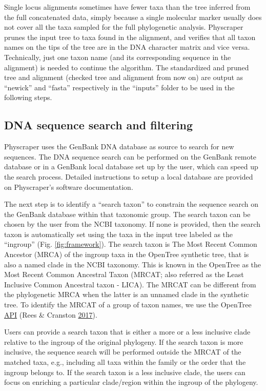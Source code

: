 \documentclass[]{article}
\begin{document}
Single locus alignments sometimes have fewer taxa than the tree inferred from the full concatenated data, simply because a single molecular marker usually does not cover all the taxa sampled for the full phylogenetic analysis. Physcraper prunes the input tree to taxa found in the alignment, and verifies that all taxon names on the tips of the tree are in the DNA character matrix and vice versa. Technically, just one taxon name (and its corresponding sequence in the alignment) is needed to continue the algorithm.
The standardized and pruned tree and alignment (checked tree and alignment from now on) are output as ``newick'' and ``fasta'' respectively in the ``inputs'' folder to be used in the following steps.

\hypertarget{dna-sequence-search-and-filtering}{%
\subsection{DNA sequence search and filtering}\label{dna-sequence-search-and-filtering}}

Physcraper uses the GenBank DNA database as source to search for new sequences. The DNA sequence search can be performed on the GenBank remote database or in a GenBank local database set up by the user, which can speed up the search process. Detailed instructions to setup a local database are provided on Physcraper's software documentation.

The next step is to identify a ``search taxon'' to constrain the sequence search on the GenBank database within that taxonomic group.
The search taxon can be chosen by the user from the NCBI taxonomy.
If none is provided, then the search taxon is automatically set using the taxa in the input tree labeled as the ``ingroup'' (Fig. \ref{fig:framework}).
The search taxon is The Most Recent Common Ancestor (MRCA) of the ingroup taxa in the OpenTree synthetic tree, that is also a named clade in the NCBI taxonomy.
This is known in the OpenTree as the Most Recent Common
Ancestral Taxon (MRCAT; also referred as the Least Inclusive Common Ancestral taxon - LICA).
The MRCAT can be different from the phylogenetic MRCA when the latter is an unnamed clade in the synthetic tree.
To identify the MRCAT of a group of taxon names, we use the OpenTree \href{https://github.com/OpenTreeOfLife/germinator/wiki/Taxonomy-API-v3\#mrca}{API} (Rees \& Cranston \protect\hyperlink{ref-rees2017automated}{2017}).

Users can provide a search taxon that is either a more or a less inclusive
clade relative to the ingroup of the original phylogeny. If the search taxon is more inclusive, the sequence search will be performed outside the MRCAT of the matched taxa, e.g., including all taxa within
the family or the order that the ingroup belongs to. If the search taxon is a less inclusive clade, the users can focus on enriching a particular clade/region within the ingroup of the phylogeny.
\end{document}
